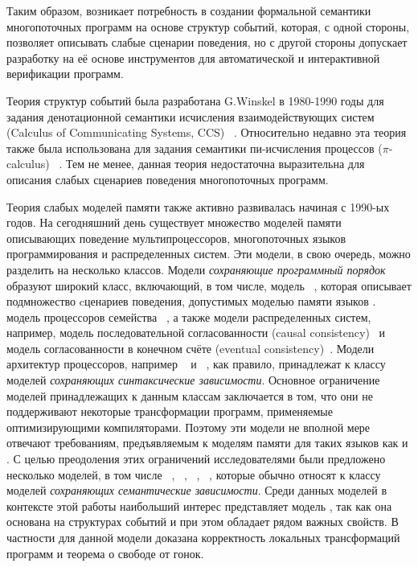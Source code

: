 Таким образом, возникает потребность в создании формальной семантики 
многопоточных программ на основе структур событий, 
которая, с одной стороны, позволяет описывать слабые сценарии поведения, 
но с другой стороны допускает разработку на её основе 
инструментов для автоматической и интерактивной верификации программ. 

{\progress}

Теория структур событий была разработана G.Winskel
в 1980-1990 годы для задания денотационной семантики 
исчисления взаимодействующих систем (Calculus of Communicating Systems, CCS)%
~\autocite{Winskel:ICALP1982}.
Относительно недавно эта теория также была использована 
для задания семантики пи-исчисления процессов ($\pi$-calculus)%
~\autocite{Varacca-Nobuko:TCS10,Crafa-al:FSCCS12,Hildebrandt-al:LATA2017}.
Тем не менее, данная теория недостаточна выразительна
для описания слабых сценариев поведения многопоточных программ.

Теория слабых моделей памяти также активно развивалась начиная с 1990-ых годов. 
На сегодняшний день существует множество моделей памяти 
описывающих поведение мультипроцессоров, 
многопоточных языков программирования и распределенных систем. 
Эти модели, в свою очередь, можно разделить на несколько классов. 
Модели \emph{сохраняющие программный порядок} образуют широкий класс, 
включающий, в том числе, модель \RCMM~\autocite{Lahav-al:PLDI17},
которая описывает подмножество cценариев поведения, допустимых моделью памяти языков \CPP.
модель \TSO процессоров семейства \Intel~\autocite{Sewell-al:CACM10},
а также модели распределенных систем, 
например, модель последовательной согласованности (causal consistency)~\autocite{Lahav-Boker:PLDI2020}
и модель согласованности в конечном счёте (eventual consistency)~\autocite{Jagadeesan-al:ESOP2018}.
Модели архитектур процессоров, например ~\autocite{Pulte-al:POPL18} 
и \POWER~\autocite{Sarkar-al:PLDI11}, 
как правило, принадлежат к классу моделей \emph{сохраняющих синтаксические зависимости}. 
Основное ограничение моделей принадлежащих к данным классам заключается в том, 
что они не поддерживают некоторые трансформации программ, 
применяемые оптимизирующими компиляторами. 
Поэтому эти модели не вполной мере отвечают требованиям, 
предъявляемым к моделям памяти для таких языков как \CPP и \Java. 
С целью преодоления этих ограничений исследователями 
были предложено несколько моделей, в том числе 
\Prm~\autocite{Kang-al:POPL17}, \Wkm~\autocite{Chakraborty-Vafeiadis:POPL19}, 
\MRD~\autocite{Paviotti-al:ESOP20}, \PwP~\autocite{Jagadeesan-al:OOPSLA2020},
которые обычно относят к классу моделей \emph{сохраняющих семантические зависимости}.
Среди данных моделей в контексте этой работы наибольший интерес представляет модель \Wkm,
так как она основана на структурах событий и при этом
обладает рядом важных свойств.
В частности для данной модели доказана корректность локальных трансформаций программ 
и теорема о свободе от гонок.

